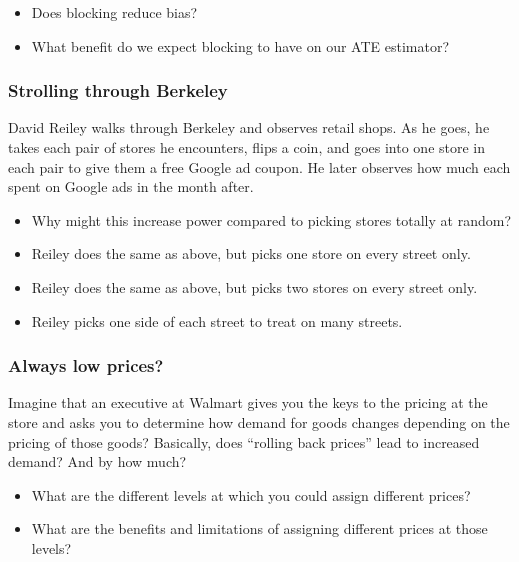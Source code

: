 \documentclass[
]{article}
\providecommand{\tightlist}{%
  \setlength{\itemsep}{0pt}\setlength{\parskip}{0pt}}
\begin{document}
\begin{itemize}
\tightlist
\item
  Does blocking reduce bias?
\item
  What benefit do we expect blocking to have on our ATE estimator?
\end{itemize}

\hypertarget{strolling-through-berkeley}{%
\subsubsection{Strolling through Berkeley}\label{strolling-through-berkeley}}

David Reiley walks through Berkeley and observes retail shops. As he goes, he takes each pair of stores he encounters, flips a coin, and goes into one store in each pair to give them a free Google ad coupon. He later observes how much each spent on Google ads in the month after.

\begin{itemize}
\tightlist
\item
  Why might this increase power compared to picking stores totally at random?
\item
  Reiley does the same as above, but picks one store on every street only.
\item
  Reiley does the same as above, but picks two stores on every street only.
\item
  Reiley picks one side of each street to treat on many streets.
\end{itemize}

\hypertarget{always-low-prices}{%
\subsubsection{Always low prices?}\label{always-low-prices}}

Imagine that an executive at Walmart gives you the keys to the pricing at the store and asks you to determine how demand for goods changes depending on the pricing of those goods? Basically, does ``rolling back prices'' lead to increased demand? And by how much?

\begin{itemize}
\tightlist
\item
  What are the different levels at which you could assign different prices?
\item
  What are the benefits and limitations of assigning different prices at those levels?
\end{itemize}
\end{document}
